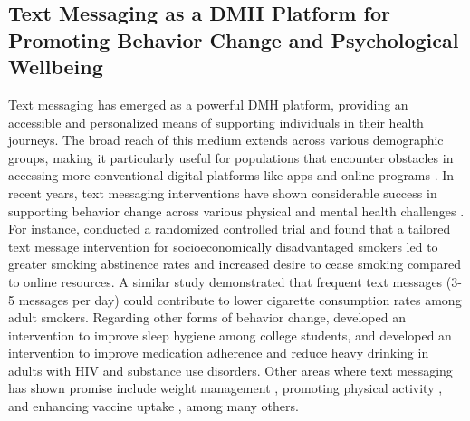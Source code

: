 \subsection{Text Messaging as a DMH Platform for Promoting
Behavior Change and Psychological Wellbeing}
Text messaging has emerged as a powerful DMH platform, providing an accessible and personalized means of supporting individuals in their health journeys. The broad reach of this medium extends across various demographic groups, making it particularly useful for populations that encounter obstacles in accessing more conventional digital platforms like apps and online programs \cite{muench2017more, bhattacharjee2022kind}.
In recent years, text messaging interventions have shown considerable success in supporting behavior change across various physical and mental health challenges \cite{haug2013efficacy, haug2013pre, yun2013text, suffoletto2023effectiveness, shalaby2022text, figueroa2022daily, bhandari2022effectiveness, villanti2022tailored, gipson2019effects}. For instance, \citet{villanti2022tailored} conducted a randomized controlled trial and found that a tailored text message intervention for socioeconomically disadvantaged smokers led to greater smoking abstinence rates and increased desire to cease smoking compared to online resources. A similar study \cite{liao2018effectiveness} demonstrated that frequent text messages (3-5 messages per day) could contribute to lower cigarette consumption rates among adult smokers. 
Regarding other forms of behavior change, \citet{gipson2019effects} developed an intervention to improve sleep hygiene among college students, and \citet{glasner2022promising} developed an intervention to improve medication adherence and reduce heavy drinking in adults with HIV and substance use disorders. 
Other areas where text messaging has shown promise include weight management \cite{siopis2015systematic, donaldson2014text}, promoting physical activity \cite{kim2013text, smith2020text, murnane2020designing}, and enhancing vaccine uptake \cite{buttenheim2022effects, mehta2022effect}, among many others.

